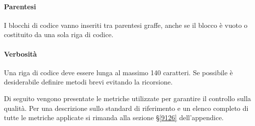 \paragraph*{Parentesi}
I blocchi di codice vanno inseriti tra parentesi graffe, anche se il blocco è vuoto o costituito da una sola riga di codice.
\paragraph*{Verbosità}
Una riga di codice deve essere lunga al massimo 140 caratteri. Se possibile è desiderabile definire metodi brevi evitando la ricorsione.

\label{MCodifica}
Di seguito vengono presentate le metriche utilizzate per garantire il controllo sulla qualità. Per una descrizione sullo standard di riferimento e un elenco completo di tutte le metriche applicate si rimanda alla sezione \S\ref{9126} dell'appendice. 
